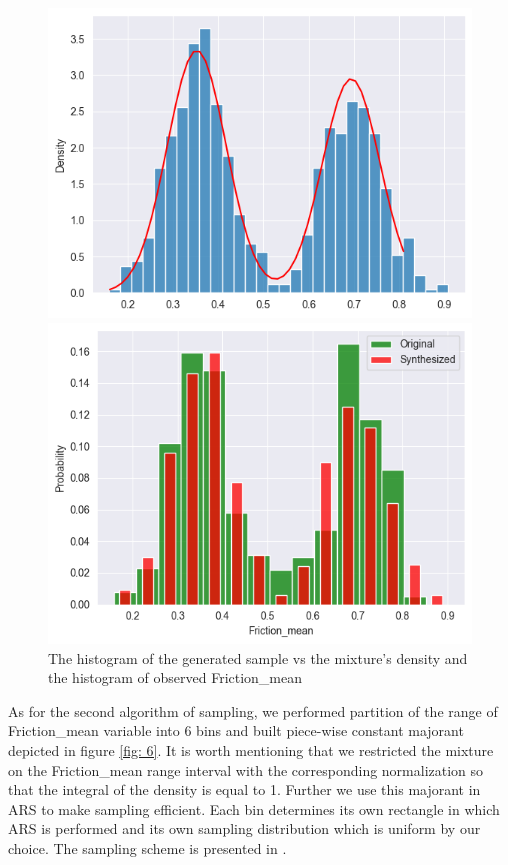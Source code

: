\documentclass[12pt, bachelor, substylefile = algo_title.rtx]{disser}
\theoremstyle{definition}
\begin{document}
\begin{figure}[!h]
   \begin{minipage}{.48\textwidth}
     \includegraphics[width=\linewidth]{eta0}
   \end{minipage} \hfill
\begin{minipage}{.48\textwidth}
     \includegraphics[width=\linewidth]{eta1}
   \end{minipage}
\caption{The histogram of the generated sample vs the mixture's density and the histogram of observed Friction\_mean}
\label{fig: 5}
\end{figure}

As for the second algorithm of sampling, we performed partition of the range of Friction\_mean variable into 6 bins and built piece-wise constant majorant depicted in figure \ref{fig: 6}. It is worth mentioning that we restricted the mixture on the Friction\_mean range interval with the corresponding normalization so that the integral of the density is equal to 1. Further we use this majorant in ARS to make sampling efficient. Each bin determines its own rectangle in which ARS is performed and its own sampling distribution which is uniform by our choice. The sampling scheme is presented in \cite{Marholm20}.
\end{document}
